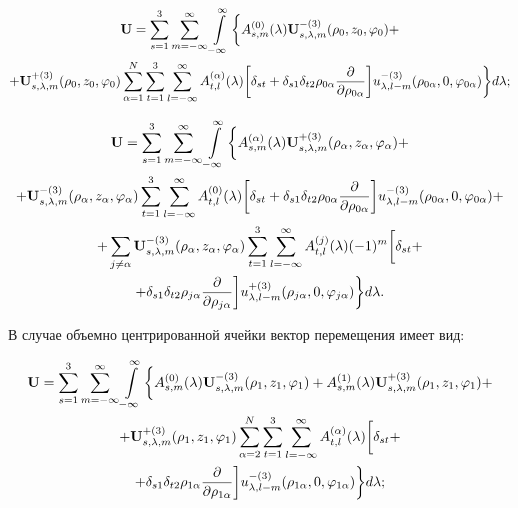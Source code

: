 \begin{multline}
{\bf{U}} = \sum\limits_{s = 1}^3 {\sum\limits_{m =  - \infty }^\infty  {\int\limits_{ - \infty }^\infty\bigg\{  } } A_{s,m}^{(0)}(\lambda ){\bf{U}}_{s,\lambda ,m}^{ - (3)}({\rho _0},{z_0},{\varphi _0}) + \\
+ {\bf{U}}_{s,\lambda ,m}^{ + (3)}({\rho _0},{z_0},{\varphi _0})\sum\limits_{\alpha  = 1}^N {\sum\limits_{t = 1}^3 {\sum\limits_{l =  - \infty }^\infty  {A_{t,l}^{(\alpha )}} } } (\lambda )\bigg[{\delta _{st}} + {\delta _{s1}}{\delta _{t2}}{\rho _{0\alpha }}\frac{\partial }{{\partial {\rho _{0\alpha }}}}\bigg]u_{\lambda ,l - m}^{ - (3)}({\rho _{0\alpha }},0,{\varphi _{0\alpha }})\bigg\} d\lambda;
\label{eq:7:13}
\end{multline}

\begin{multline}
{\bf{U}} = \sum\limits_{s = 1}^3 {\sum\limits_{m =  - \infty }^\infty  {\int\limits_{ - \infty }^\infty  \bigg\{  } } A_{s,m}^{(\alpha )}(\lambda ){\bf{U}}_{s,\lambda ,m}^{ + (3)}({\rho _\alpha },{z_\alpha },{\varphi _\alpha }) + \\
+ {\bf{U}}_{s,\lambda ,m}^{ - (3)}({\rho _\alpha },{z_\alpha },{\varphi _\alpha })\sum\limits_{t = 1}^3 {\sum\limits_{l =  - \infty }^\infty  {A_{t,l}^{(0)}} } (\lambda )\bigg[{\delta _{st}} + {\delta _{s1}}{\delta _{t2}}{\rho _{0\alpha }}\frac{\partial }{{\partial {\rho _{0\alpha }}}}\bigg]u_{\lambda ,l - m}^{ - (3)}({\rho _{0\alpha }},0,{\varphi _{0\alpha }}) + \\
+ \sum\limits_{j \ne \alpha } {{\bf{U}}_{s,\lambda ,m}^{ - (3)}} ({\rho _\alpha },{z_\alpha },{\varphi _\alpha })\sum\limits_{t = 1}^3 {\sum\limits_{l =  - \infty }^\infty  {A_{t,l}^{(j)}} } (\lambda ){( - 1)^m}\bigg[{\delta _{st}} + \\
+ {\delta _{s1}}{\delta _{t2}}{\rho _{j\alpha }}\frac{\partial }{{\partial {\rho _{j\alpha }}}}\bigg]u_{\lambda ,l - m}^{ + (3)}({\rho _{j\alpha }},0,{\varphi _{j\alpha }})\bigg\} d\lambda.
\label{eq:7:14}
\end{multline}

В случае объемно центрированной ячейки вектор перемещения имеет вид:

\begin{multline}
{\bf{U}} = \sum\limits_{s = 1}^3 {\sum\limits_{m =  - \infty }^\infty  {\int\limits_{ - \infty }^\infty  \bigg\{  } } A_{s,m}^{(0)}(\lambda ){\bf{U}}_{s,\lambda ,m}^{ - (3)}({\rho _1},{z_1},{\varphi _1}) + A_{s,m}^{(1)}(\lambda ){\bf{U}}_{s,\lambda ,m}^{ + (3)}({\rho _1},{z_1},{\varphi _1}) + \\
+ {\bf{U}}_{s,\lambda ,m}^{ + (3)}({\rho _1},{z_1},{\varphi _1})\sum\limits_{\alpha  = 2}^N {\sum\limits_{t = 1}^3 {\sum\limits_{l =  - \infty }^\infty  {A_{t,l}^{(\alpha )}} } } (\lambda )\bigg[{\delta _{st}} + \\
+ {\delta _{s1}}{\delta _{t2}}{\rho _{1\alpha }}\frac{\partial }{{\partial {\rho _{1\alpha }}}}\bigg]u_{\lambda ,l - m}^{ - (3)}({\rho _{1\alpha }},0,{\varphi _{1\alpha }})\bigg\} d\lambda;
\label{eq:7:15}
\end{multline}

